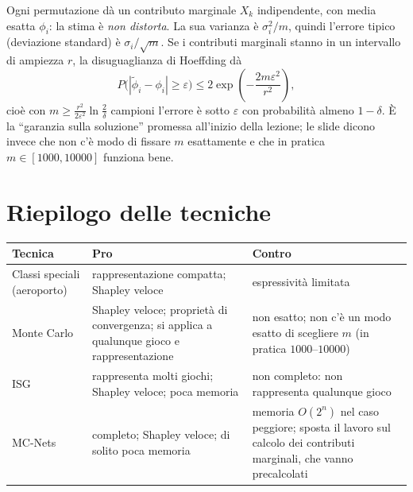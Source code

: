 \begin{extra}
Ogni permutazione dà un contributo marginale $X_k$ indipendente, con media esatta $\phi_i$:
la stima è \emph{non distorta}. La sua varianza è $\sigma_i^2/m$, quindi l'errore tipico
(deviazione standard) è $\sigma_i/\sqrt{m}$. Se i contributi marginali stanno in un
intervallo di ampiezza $r$, la disuguaglianza di Hoeffding dà
\[
  P\bigl(|\tilde\phi_i - \phi_i| \ge \varepsilon\bigr) \le 2\exp\!\left(-\frac{2m\varepsilon^2}{r^2}\right),
\]
cioè con $m \ge \frac{r^2}{2\varepsilon^2}\ln\frac{2}{\delta}$ campioni l'errore è sotto
$\varepsilon$ con probabilità almeno $1 - \delta$. È la ``garanzia sulla soluzione''
promessa all'inizio della lezione; le slide dicono invece che non c'è modo di fissare $m$
esattamente e che in pratica $m \in [1000, 10000]$ funziona bene.
\end{extra}

\section{Riepilogo delle tecniche}

\begin{center}
\renewcommand{\arraystretch}{1.3}
\begin{tabularx}{\linewidth}{@{}>{\raggedright\arraybackslash}p{2.9cm} X X@{}}
\toprule
\textbf{Tecnica} & \textbf{Pro} & \textbf{Contro} \\
\midrule
Classi speciali (aeroporto) & rappresentazione compatta; Shapley veloce &
  espressività limitata \\
Monte Carlo & Shapley veloce; proprietà di convergenza; si applica a qualunque gioco e
  rappresentazione & non esatto; non c'è un modo esatto di scegliere $m$ (in pratica
  $1000$--$10000$) \\
ISG & rappresenta molti giochi; Shapley veloce; poca memoria &
  non completo: non rappresenta qualunque gioco \\
MC-Nets & completo; Shapley veloce; di solito poca memoria &
  memoria $O(2^n)$ nel caso peggiore; sposta il lavoro sul calcolo dei contributi
  marginali, che vanno precalcolati \\
\bottomrule
\end{tabularx}
\end{center}


